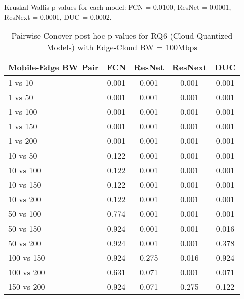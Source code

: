 \begin{table}[h]
\centering
\caption{Pairwise Conover post-hoc p-values for RQ6 (Cloud Quantized Models) with Edge-Cloud BW = 100Mbps}
\label{tab:conover_cloud_quantized_ec100}
\smallskip
Kruskal-Wallis p-values for each model: FCN = 0.0100, ResNet = 0.0001, ResNext = 0.0001, DUC = 0.0002.

\begin{tabular}{lcccc}
\toprule
Mobile-Edge BW Pair & FCN & ResNet & ResNext & DUC \\
\midrule
1 vs 10 & 0.001 & 0.001 & 0.001 & 0.001 \\
1 vs 50 & 0.001 & 0.001 & 0.001 & 0.001 \\
1 vs 100 & 0.001 & 0.001 & 0.001 & 0.001 \\
1 vs 150 & 0.001 & 0.001 & 0.001 & 0.001 \\
1 vs 200 & 0.001 & 0.001 & 0.001 & 0.001 \\
10 vs 50 & 0.122 & 0.001 & 0.001 & 0.001 \\
10 vs 100 & 0.122 & 0.001 & 0.001 & 0.001 \\
10 vs 150 & 0.122 & 0.001 & 0.001 & 0.001 \\
10 vs 200 & 0.122 & 0.001 & 0.001 & 0.001 \\
50 vs 100 & 0.774 & 0.001 & 0.001 & 0.001 \\
50 vs 150 & 0.924 & 0.001 & 0.001 & 0.016 \\
50 vs 200 & 0.924 & 0.001 & 0.001 & 0.378 \\
100 vs 150 & 0.924 & 0.275 & 0.016 & 0.924 \\
100 vs 200 & 0.631 & 0.071 & 0.001 & 0.071 \\
150 vs 200 & 0.924 & 0.071 & 0.275 & 0.122 \\
\bottomrule
\end{tabular}
\end{table}

